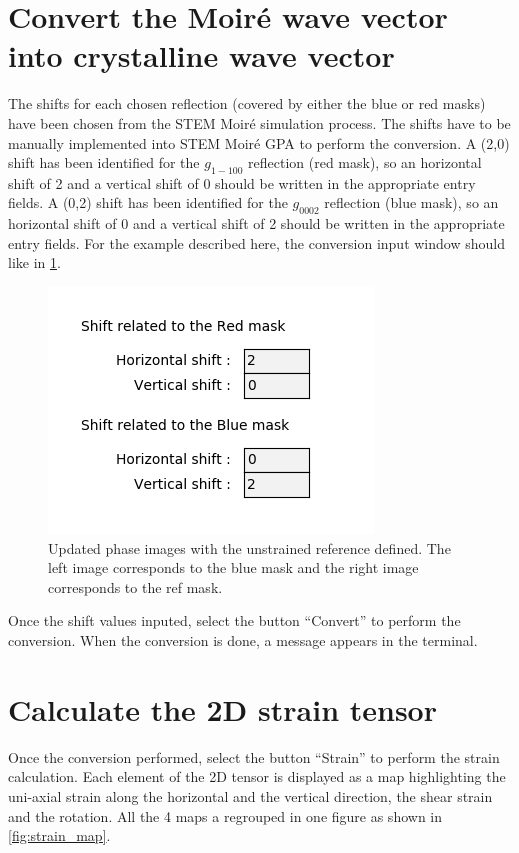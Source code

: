 \documentclass[12pt, titlepage]{article}
\newcommand{\progname}{STEM Moir{\'e} GPA}
\begin{document}
\section{Convert the Moir{\'e} wave vector into crystalline wave vector}

The shifts for each chosen reflection (covered by either the blue or red masks) have been chosen from the STEM Moir{\'e} simulation process. The shifts have to be manually implemented into \progname{} to perform the conversion. A (2,0) shift has been identified for the $g_{1-100}$ reflection (red mask), so an horizontal shift of 2 and a vertical shift of 0 should be written in the appropriate entry fields. A (0,2) shift has been identified for the $g_{0002}$ reflection (blue mask), so an horizontal shift of 0 and a vertical shift of 2 should be written in the appropriate entry fields. For the example described here, the conversion input window should like in \cref{fig:nm_shift_filled}.

\begin{figure}[H]
\centering
\includegraphics[scale=0.8]{Figures/(n,m)_shift-1.png}
\caption{Updated phase images with the unstrained reference defined. The left image corresponds to the blue mask and the right image corresponds to the ref mask.}
\label{fig:nm_shift_filled}
\end{figure}

Once the shift values inputed, select the button \enquote{Convert} to perform the conversion. When the conversion is done, a message appears in the terminal.

\section{Calculate the 2D strain tensor}

Once the conversion performed, select the button \enquote{Strain} to perform the strain calculation. Each element of the 2D tensor is displayed as a map highlighting the uni-axial strain along the horizontal and the vertical direction, the shear strain and the rotation. All the 4 maps a regrouped in one figure as shown in \cref{fig:strain_map}.
\end{document}
